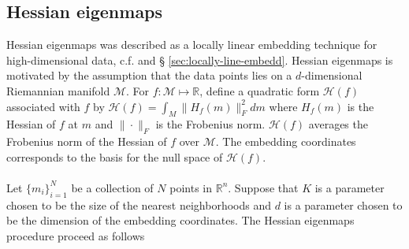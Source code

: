 \subsection{Hessian eigenmaps}
\label{sec:hessian-eigenmaps}
Hessian eigenmaps \citep{donoho03:_hesian} was described as a locally
linear embedding technique for high-dimensional data,
c.f. \citep{roweis00:_nonlin} and \S
\ref{sec:locally-line-embedd}. Hessian eigenmaps is motivated by the
assumption that the data points lies on a $d$-dimensional Riemannian
manifold $\mathcal{M}$. For $f \colon \mathcal{M} \mapsto \mathbb{R}$,
define a quadratic form $\mathcal{H}(f)$ associated with $f$ by
$\mathcal{H}(f) = \int_{M}{ \| H_f(m) \|_{F}^{2} dm }$ where $H_f(m)$
is the Hessian of $f$ at $m$ and $\| \cdot \|_F$ is the Frobenius
norm. $\mathcal{H}(f)$ averages the Frobenius norm of the Hessian of
$f$ over $\mathcal{M}$. The embedding coordinates
corresponds to the basis for the null space of $\mathcal{H}(f)$. \\ \\
\noindent
Let $\{m_i\}_{i=1}^{N}$ be a collection of $N$ points in
$\mathbb{R}^{n}$. Suppose that $K$ is a parameter chosen to be the
size of the nearest neighborhoods and $d$ is a parameter chosen to be
the dimension of the embedding coordinates. The Hessian eigenmaps
procedure proceed as follows \citet{donoho03:_hesian}
